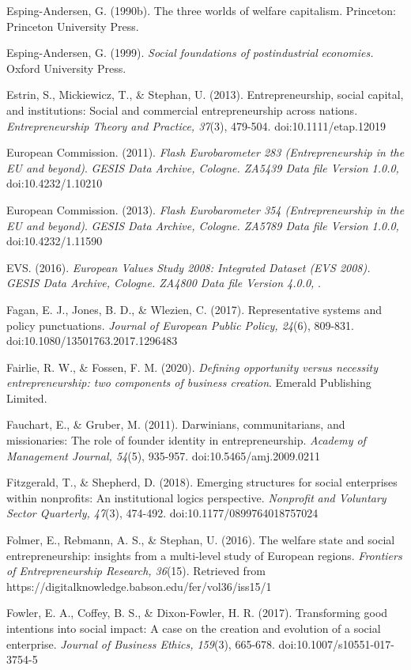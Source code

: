 \documentclass{article}
\begin{document}
Esping-Andersen, G. (1990b). The three worlds of welfare capitalism. Princeton: Princeton University Press.

Esping-Andersen, G. (1999). \emph{Social foundations of }\emph{postindustrial}\emph{ economies.} Oxford University Press.

Estrin, S., Mickiewicz, T., \& Stephan, U. (2013). Entrepreneurship, social capital, and institutions: Social and commercial entrepreneurship across nations. \emph{Entrepreneurship Theory and Practice, 37}(3), 479-504. doi:10.1111/etap.12019

European Commission. (2011). \emph{Flash Eurobarometer 283 (Entrepreneurship in the EU and beyond)}. \emph{GESIS Data Archive, Cologne. ZA5439 Data file Version 1.0.0, }doi:10.4232/1.10210

European Commission. (2013). \emph{Flash Eurobarometer 354 (Entrepreneurship in the EU and beyond)}. \emph{GESIS Data Archive, Cologne. ZA5789 Data file Version 1.0.0, }doi:10.4232/1.11590

EVS. (2016). \emph{European Values Study 2008: Integrated Dataset (EVS 2008). GESIS Data Archive, Cologne. ZA4800 Data file Version 4.0.0}\emph{, }. 

Fagan, E. J., Jones, B. D., \& Wlezien, C. (2017). Representative systems and policy punctuations. \emph{Journal of European Public Policy, 24}(6), 809-831. doi:10.1080/13501763.2017.1296483

Fairlie, R. W., \& Fossen, F. M. (2020). \emph{Defining opportunity versus necessity entrepreneurship: two components of business creation}. Emerald Publishing Limited.

Fauchart, E., \& Gruber, M. (2011). Darwinians, communitarians, and missionaries: The role of founder identity in entrepreneurship. \emph{Academy of Management Journal, 54}(5), 935-957. doi:10.5465/amj.2009.0211

Fitzgerald, T., \& Shepherd, D. (2018). Emerging structures for social enterprises within nonprofits: An institutional logics perspective. \emph{Nonprofit}\emph{ and Voluntary Sector Quarterly, 47}(3), 474-492. doi:10.1177/0899764018757024

Folmer, E., Rebmann, A. S., \& Stephan, U. (2016). The welfare state and social entrepreneurship: insights from a multi-level study of European regions. \emph{Frontiers of Entrepreneurship Research, 36}(15). Retrieved from https://digitalknowledge.babson.edu/fer/vol36/iss15/1

Fowler, E. A., Coffey, B. S., \& Dixon-Fowler, H. R. (2017). Transforming good intentions into social impact: A case on the creation and evolution of a social enterprise. \emph{Journal of Business Ethics, 159}(3), 665-678. doi:10.1007/s10551-017-3754-5
\end{document}
